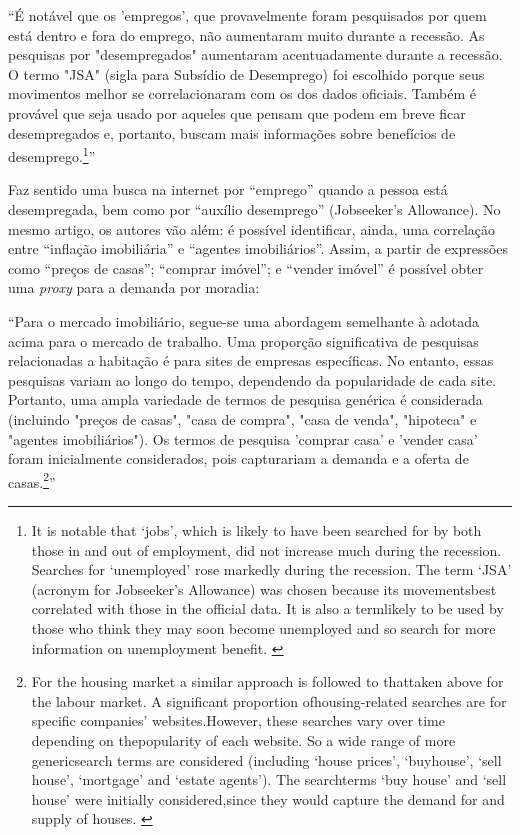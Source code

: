 \begin{citacao}``É notável que os 'empregos', que provavelmente foram pesquisados por quem está dentro e fora do emprego, não aumentaram muito durante a recessão. As pesquisas por "desempregados" aumentaram acentuadamente durante a recessão. O termo "JSA" (sigla para Subsídio de Desemprego) foi escolhido porque seus movimentos melhor se correlacionaram com os dos dados oficiais. Também é provável que seja usado por aqueles que pensam que podem em breve ficar desempregados e, portanto, buscam mais informações sobre benefícios de desemprego.\footnote{It is notable that ‘jobs’, which is likely to have been searched for by both those in and out of employment, did not increase much during the recession.  Searches for ‘unemployed’ rose markedly during the recession.  The term ‘JSA’ (acronym for Jobseeker’s Allowance) was chosen because its movementsbest correlated with those in the official data.  It is also a termlikely to be used by those who think they may soon become unemployed and so search for more information on unemployment benefit. \cite[p.136]{mclaren2011using}}'' \cite[p.136]{mclaren2011using}
\end{citacao}

Faz sentido uma busca na internet por ``emprego'' quando a pessoa está desempregada, bem como por ``auxílio desemprego'' (Jobseeker’s Allowance). No mesmo artigo, os autores vão além: é possível identificar, ainda, uma correlação entre ``inflação imobiliária'' e ``agentes imobiliários''. Assim, a partir de expressões como ``preços de casas''; ``comprar imóvel''; e ``vender imóvel'' é possível obter uma \textit{proxy} para a demanda por moradia:

\begin{citacao}``Para o mercado imobiliário, segue-se uma abordagem semelhante à adotada acima para o mercado de trabalho. Uma proporção significativa de pesquisas relacionadas a habitação é para sites de empresas específicas. No entanto, essas pesquisas variam ao longo do tempo, dependendo da popularidade de cada site. Portanto, uma ampla variedade de termos de pesquisa genérica é considerada (incluindo "preços de casas", "casa de compra", "casa de venda", "hipoteca" e "agentes imobiliários"). Os termos de pesquisa 'comprar casa' e 'vender casa' foram inicialmente considerados, pois capturariam a demanda e a oferta de casas.\footnote{For the housing market a similar approach is followed to thattaken above for the labour market.  A significant proportion ofhousing-related searches are for specific companies’ websites.However, these searches vary over time depending on thepopularity of each website.  So a wide range of more genericsearch terms are considered (including ‘house prices’, ‘buyhouse’, ‘sell house’, ‘mortgage’ and ‘estate agents’).  The searchterms ‘buy house’ and ‘sell house’ were initially considered,since they would capture the demand for and supply of houses. \cite[p.137]{mclaren2011using}}'' \cite[p.137]{mclaren2011using}
\end{citacao}

